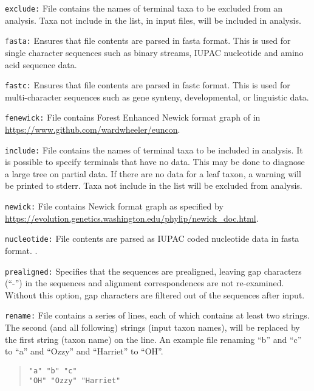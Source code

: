 \documentclass[11pt]{article}
\begin{document}
			\smallskip		
			\noindent \texttt{exclude:}  File contains the names of terminal taxa to be excluded from an analysis.  Taxa not include in the list, in input files, will be included in analysis. 
			
			\smallskip		
			\noindent \texttt{fasta:} Ensures that file contents are parsed in fasta \citep{PearsonandLipman1988} format. This is used for single character sequences such as binary streams, IUPAC nucleotide and amino acid sequence data.
			
			\smallskip		
			\noindent \texttt{fastc:} Ensures that file contents are parsed in fastc \citep{WheelerandWashburn2019} format. This is used for multi-character sequences such as gene synteny, developmental,  or linguistic  data.
			
			\smallskip		
			\noindent \texttt{fenewick:}  File contains Forest Enhanced Newick format graph of \cite{Wheeler2021a} in \url{https://www.github.com/wardwheeler/euncon}.
			
			\smallskip		
			\noindent \texttt{include:}  File contains the names of terminal taxa to be included in analysis.  It is possible to specify terminals that have no data.  This may be done to diagnose a large tree on partial data.  If there are no data for a leaf taxon, a warning will be printed to stderr.  Taxa not include in the list will be excluded from analysis. 
			
			\smallskip		
			\noindent \texttt{newick:} File contains  Newick format graph as specified by \url{https://evolution.genetics.washington.edu/phylip/newick_doc.html}.
			
			\smallskip		
			\noindent \texttt{nucleotide:} File contents are parsed as IUPAC coded nucleotide data in fasta \citep{PearsonandLipman1988} format. .
			
			\smallskip		
			\noindent \texttt{prealigned:} Specifies that the sequences are prealigned, leaving gap characters
			(``-'') in the sequences and alignment correspondences are not re-examined. Without this option,
			gap characters are filtered out of the sequences after input.
			
			\smallskip		
			\noindent \texttt{rename:} File contains a series of lines, each of which contains at least two strings.  The second (and all following) strings (input taxon names),
			will be replaced by the first string (taxon name) on the line. An example file renaming ``b'' and ``c''  to ``a'' and ``Ozzy'' and ``Harriet'' to ``OH''.
				\begin{quote}
				\texttt{"a" "b" "c"}\\
				\texttt{"OH" "Ozzy" "Harriet"}
			\end{quote}
		
\end{document}
